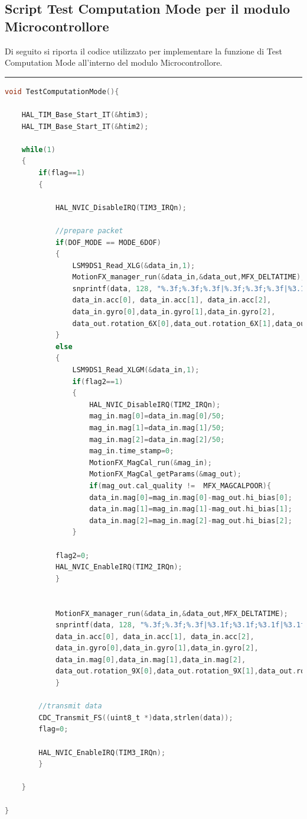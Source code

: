 \subsection{Script Test Computation Mode per il modulo Microcontrollore}
\label{app:tcm}
Di seguito si riporta il codice utilizzato per implementare la funzione di Test Computation Mode all'interno del modulo Microcontrollore.\\
\noindent\rule{14.1cm}{0.4pt}
\begin{lstlisting}[language=C]
void TestComputationMode(){

	HAL_TIM_Base_Start_IT(&htim3);
	HAL_TIM_Base_Start_IT(&htim2);

	while(1)
	{
		if(flag==1)
		{

			HAL_NVIC_DisableIRQ(TIM3_IRQn);

			//prepare packet
			if(DOF_MODE == MODE_6DOF)
			{
				LSM9DS1_Read_XLG(&data_in,1);
				MotionFX_manager_run(&data_in,&data_out,MFX_DELTATIME);
				snprintf(data, 128, "%.3f;%.3f;%.3f|%.3f;%.3f;%.3f|%3.1f;%3.1f;%3.1f\n",
				data_in.acc[0], data_in.acc[1], data_in.acc[2],
				data_in.gyro[0],data_in.gyro[1],data_in.gyro[2],
				data_out.rotation_6X[0],data_out.rotation_6X[1],data_out.rotation_6X[2]);
			}
			else
			{
				LSM9DS1_Read_XLGM(&data_in,1);
				if(flag2==1)
				{
					HAL_NVIC_DisableIRQ(TIM2_IRQn);
					mag_in.mag[0]=data_in.mag[0]/50;
					mag_in.mag[1]=data_in.mag[1]/50;
					mag_in.mag[2]=data_in.mag[2]/50;
					mag_in.time_stamp=0;
					MotionFX_MagCal_run(&mag_in);
					MotionFX_MagCal_getParams(&mag_out);
					if(mag_out.cal_quality !=  MFX_MAGCALPOOR){
					data_in.mag[0]=mag_in.mag[0]-mag_out.hi_bias[0];
					data_in.mag[1]=mag_in.mag[1]-mag_out.hi_bias[1];
					data_in.mag[2]=mag_in.mag[2]-mag_out.hi_bias[2];
				}

			flag2=0;
			HAL_NVIC_EnableIRQ(TIM2_IRQn);
			}


			MotionFX_manager_run(&data_in,&data_out,MFX_DELTATIME);
			snprintf(data, 128, "%.3f;%.3f;%.3f|%3.1f;%3.1f;%3.1f|%3.1f;%3.1f;%3.1f|%3.1f;%3.1f;%3.1f\n",
			data_in.acc[0], data_in.acc[1], data_in.acc[2],
			data_in.gyro[0],data_in.gyro[1],data_in.gyro[2],
			data_in.mag[0],data_in.mag[1],data_in.mag[2],
			data_out.rotation_9X[0],data_out.rotation_9X[1],data_out.rotation_9X[2]);
			}

		//transmit data
		CDC_Transmit_FS((uint8_t *)data,strlen(data));
		flag=0;

		HAL_NVIC_EnableIRQ(TIM3_IRQn);
		}

	}	

}
\end{lstlisting}



